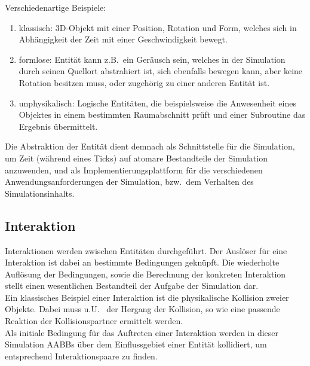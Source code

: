 Verschiedenartige Beispiele:
\begin{enumerate}
\item klassisch: 3D-Objekt mit einer Position, Rotation und Form, welches sich in Abhängigkeit der Zeit mit einer Geschwindigkeit bewegt.\\
\item formlose: Entität kann z.B.~ein Geräusch sein, welches in der Simulation durch seinen Quellort abstrahiert ist, sich ebenfalls bewegen kann, aber keine Rotation besitzen muss, oder zugehörig zu einer anderen Entität ist.
\item unphysikalisch: Logische Entitäten, die beispielsweise die Anwesenheit eines Objektes in einem bestimmten Raumabschnitt prüft und einer Subroutine das Ergebnis übermittelt.
\end{enumerate}
Die Abstraktion der Entität dient demnach als Schnittstelle für die Simulation, um Zeit (während eines Ticks) auf atomare Bestandteile der Simulation anzuwenden, und als Implementierungsplattform für die verschiedenen Anwendungsanforderungen der Simulation, bzw.~dem Verhalten des Simulationsinhalts.

\subsection{Interaktion}
Interaktionen werden zwischen Entitäten durchgeführt. Der Auslöser für eine Interaktion ist dabei an bestimmte Bedingungen geknüpft. Die wiederholte Auflösung der Bedingungen, sowie die Berechnung der konkreten Interaktion stellt einen wesentlichen Bestandteil der Aufgabe der Simulation dar.\\
Ein klassisches Beispiel einer Interaktion ist die physikalische Kollision zweier Objekte. Dabei muss u.U.~ der Hergang der Kollision, so wie eine passende Reaktion der Kollisionspartner ermittelt werden.\\
Als initiale Bedingung für das Auftreten einer Interaktion werden in dieser Simulation AABBs über dem Einflussgebiet einer Entität kollidiert, um entsprechend Interaktionspaare zu finden.



